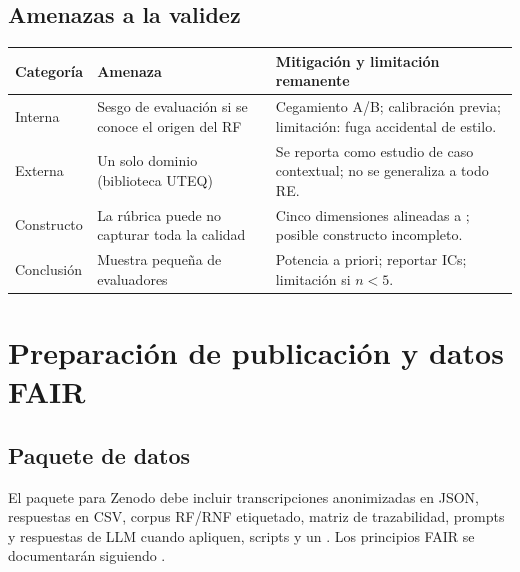 \documentclass[12pt,journal,onecolumn]{IEEEtran}
\begin{document}
\subsection{Amenazas a la validez}
\begin{tabularx}{\textwidth}{P{0.18\textwidth}Y Y}\toprule
\textbf{Categoría} & \textbf{Amenaza} & \textbf{Mitigación y limitación remanente}\\\midrule
Interna & Sesgo de evaluación si se conoce el origen del RF & Cegamiento A/B; calibración previa; limitación: fuga accidental de estilo.\\
Externa & Un solo dominio (biblioteca UTEQ) & Se reporta como estudio de caso contextual; no se generaliza a todo RE.\\
Constructo & La rúbrica puede no capturar toda la calidad & Cinco dimensiones alineadas a \cite{montgomery2022quality}; posible constructo incompleto.\\
Conclusión & Muestra pequeña de evaluadores & Potencia a priori; reportar ICs; limitación si $n<5$.\\\bottomrule
\end{tabularx}

\section{Preparación de publicación y datos FAIR}
\subsection{Paquete de datos}
El paquete para Zenodo debe incluir transcripciones anonimizadas en JSON, respuestas en CSV, corpus RF/RNF etiquetado, matriz de trazabilidad, prompts y respuestas de LLM cuando apliquen, scripts y un . Los principios FAIR se documentarán siguiendo \cite{wilkinson2016fair}.
\end{document}
